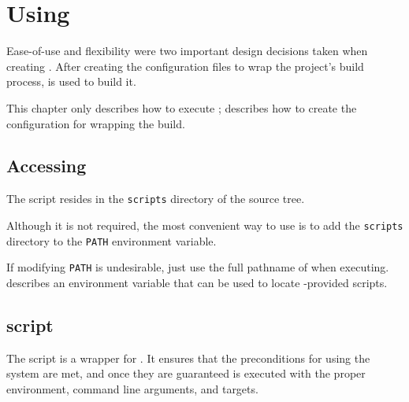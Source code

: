 %
%
%
%
\chapter{Using \lmsbw}

Ease-of-use and flexibility were two important design decisions taken
when creating \lmsbw.  After creating the configuration files to wrap
the project's build process, \lmsbwcmd is used to build it.

This chapter only describes how to execute \lmsbwcmd;
 describes how to create the configuration for
wrapping the build.

\section{Accessing \lmsbwcmd}

The \lmsbwcmd script resides in the \texttt{scripts} directory of the
\lmsbw source tree.

Although it is not required, the most convenient way to use \lmsbwcmd
is to add the \texttt{scripts} directory to the \texttt{PATH}
environment variable.

If modifying \texttt{PATH} is undesirable, just use the full pathname
of \lmsbwcmd when executing.  
describes an environment variable that can be used to locate
\lmsbw-provided scripts.

\section{\lmsbwcmd script}

The \lmsbwcmd script is a wrapper for \make.  It ensures that the
preconditions for using the \lmsbw system are met, and once they are
guaranteed \make is executed with the proper environment, command line
arguments, and targets.


